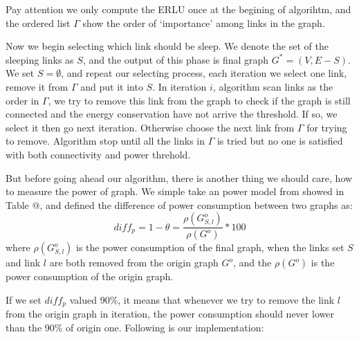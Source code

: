 \documentclass[conference]{IEEEtran}
\makeatletter
\newcommand{\Rmnum}[1]{\expandafter\@slowromancap\romannumeral #1@}
\makeatother
\begin{document}
Pay attention we only compute the ERLU once at the begining of algorihtm, and the ordered list $\Gamma$ show
the order of `importance' among links in the graph.


Now we begin selecting which link should be sleep.
We denote the set of the sleeping links as $S$, and the output of this phase is final graph $G^* = (V, E-S)$. We set
$S = \emptyset$, and repeat our selecting process, each iteration we select one link, remove it from $\Gamma$ and put it into $S$.
In iteration $i$, algorithm scan links as the order in $\Gamma$, we try to
remove this link from the graph to check if the graph is still connected and the energy conservation have not arrive the threshold.
If so, we select it then go next iteration.
Otherwise choose the next link from $\Gamma$ for trying to remove. Algorithm
stop until all the links in $\Gamma$ is tried but no one is satisfied with both connectivity and power threhold.


But before going ahead our algorithm, there is another thing we should care, how to measure the power of graph.
We simple take an power model from \cite{networking:greente} showed in Table \Rmnum{2}, and defined the difference of power consumption
between two graphs as:
\begin{equation}
	diff_p = 1 - \theta = \frac{\rho(G_{S, l}^o)} {\rho(G^o)} * 100
\end{equation}
where $\rho(G_{S, l}^o)$ is the power consumption of the final graph, when the links set $S$ and
link $l$ are both removed from the origin graph $G^o$, and the $\rho(G^o)$ is the power consumption of
the origin graph.


If we set $diff_p$ valued 90\%, it means that whenever we try to remove the link $l$ from the origin graph in
iteration, the power consumption should never lower than the 90\% of origin one. Following is our implementation:
\end{document}
